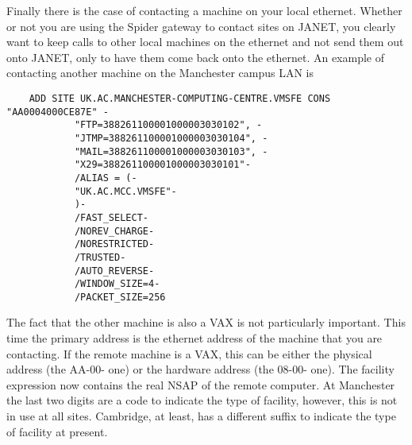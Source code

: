 Finally there is the case of contacting a machine on your local ethernet.
Whether or not you are using the Spider gateway to contact sites on JANET, you
clearly want to keep calls to other local machines on the ethernet and not send
them out onto JANET, only to have them come back onto the ethernet. An example
of contacting another machine on the Manchester campus LAN is

\begin{verbatim}
    ADD SITE UK.AC.MANCHESTER-COMPUTING-CENTRE.VMSFE CONS "AA0004000CE87E" -
            "FTP=388261100001000003030102", -
            "JTMP=388261100001000003030104", -
            "MAIL=388261100001000003030103", -
            "X29=388261100001000003030101"-
            /ALIAS = (-
            "UK.AC.MCC.VMSFE"-
            )-
            /FAST_SELECT-
            /NOREV_CHARGE-
            /NORESTRICTED-
            /TRUSTED-
            /AUTO_REVERSE-
            /WINDOW_SIZE=4-
            /PACKET_SIZE=256
\end{verbatim}

The fact that the other machine is also a VAX is not particularly important.
This time the primary address is the ethernet address of the machine that you
are contacting. If the remote machine is a VAX, this can be either the physical
address (the AA-00- one) or the hardware address (the 08-00- one). The facility
expression now contains the real NSAP of the remote computer. At Manchester the 
last two digits are a code to indicate the type of facility, however, this is
not in use at all sites. Cambridge, at least, has a different suffix to
indicate the type of facility at present.


\appendix
